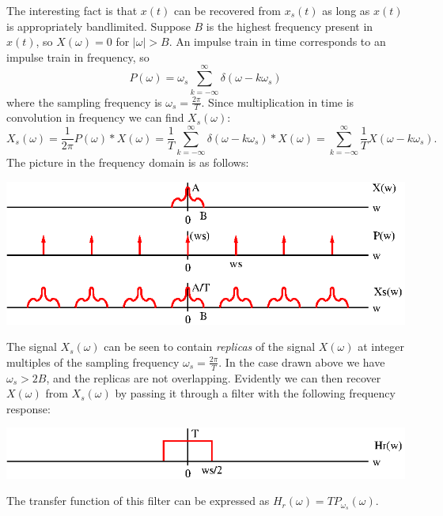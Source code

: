 \documentclass[10pt]{beamer}
\newcommand{\conv}{\ast}
\begin{document}
The interesting fact is that $x(t)$ can be recovered from $x_s(t)$ as long as $x(t)$ is appropriately bandlimited.  Suppose $B$ is the highest frequency present in $x(t)$, so $X(\omega) = 0$ for $|\omega| > B$.  An impulse train in time corresponds to an impulse train in frequency, so
\begin{equation*}
  P(\omega) = \omega_s \sum_{k=-\infty}^{\infty} \delta(\omega - k \omega_s)
\end{equation*}
where the sampling frequency is $\omega_s = \frac{2 \pi}{T}$.  Since multiplication in time is convolution in frequency we can find $X_s(\omega)$:
\begin{equation*}
  X_s(\omega) = \frac{1}{2\pi} P(\omega) \conv X(\omega)
  = \frac{1}{T} \sum_{k=-\infty}^{\infty} \delta(\omega - k \omega_s) \conv X(\omega)
  = \sum_{k=-\infty}^{\infty} \frac{1}{T} X(\omega - k \omega_s).
\end{equation*}
The picture in the frequency domain is as follows:
\begin{center}
  \includegraphics{sampxfreq}
\end{center}
The signal $X_s(\omega)$ can be seen to contain {\em replicas} of the signal $X(\omega)$ at integer multiples of the sampling frequency $\omega_s = \frac{2\pi}{T}$.  In the case drawn above we have $\omega_s>2B$, and the replicas are not overlapping.  Evidently we can then recover $X(\omega)$ from $X_s(\omega)$ by passing it through a filter with the following frequency response:
\begin{center}
  \includegraphics{sampxfilt}
\end{center}
The transfer function of this filter can be expressed as $H_r(\omega) = T P_{\omega_s}(\omega)$.
\end{document}
